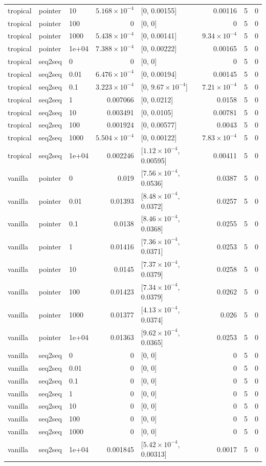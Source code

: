 \documentclass[10pt]{article}
\begin{document}
{\begin{longtable}{lllrlrrr}
tropical & pointer & 10 & $5.168\times10^{-4}$ & [0, 0.00155] & 0.00116 & 5 & 0\\
tropical & pointer & 100 & 0 & [0, 0] & 0 & 5 & 0\\
tropical & pointer & 1000 & $5.438\times10^{-4}$ & [0, 0.00141] & $9.34\times10^{-4}$ & 5 & 0\\
tropical & pointer & 1e+04 & $7.388\times10^{-4}$ & [0, 0.00222] & 0.00165 & 5 & 0\\
tropical & seq2seq & 0 & 0 & [0, 0] & 0 & 5 & 0\\
tropical & seq2seq & 0.01 & $6.476\times10^{-4}$ & [0, 0.00194] & 0.00145 & 5 & 0\\
tropical & seq2seq & 0.1 & $3.223\times10^{-4}$ & [0, $9.67\times10^{-4}$] & $7.21\times10^{-4}$ & 5 & 0\\
tropical & seq2seq & 1 & 0.007066 & [0, 0.0212] & 0.0158 & 5 & 0\\
tropical & seq2seq & 10 & 0.003491 & [0, 0.0105] & 0.00781 & 5 & 0\\
tropical & seq2seq & 100 & 0.001924 & [0, 0.00577] & 0.0043 & 5 & 0\\
tropical & seq2seq & 1000 & $5.504\times10^{-4}$ & [0, 0.00122] & $7.83\times10^{-4}$ & 5 & 0\\
tropical & seq2seq & 1e+04 & 0.002246 & [$1.12\times10^{-4}$, 0.00595] & 0.00411 & 5 & 0\\
vanilla & pointer & 0 & 0.019 & [$7.56\times10^{-4}$, 0.0536] & 0.0387 & 5 & 0\\
vanilla & pointer & 0.01 & 0.01393 & [$8.48\times10^{-4}$, 0.0372] & 0.0257 & 5 & 0\\
vanilla & pointer & 0.1 & 0.0138 & [$8.46\times10^{-4}$, 0.0368] & 0.0255 & 5 & 0\\
vanilla & pointer & 1 & 0.01416 & [$7.36\times10^{-4}$, 0.0371] & 0.0253 & 5 & 0\\
vanilla & pointer & 10 & 0.0145 & [$7.37\times10^{-4}$, 0.0379] & 0.0258 & 5 & 0\\
vanilla & pointer & 100 & 0.01423 & [$7.34\times10^{-4}$, 0.0379] & 0.0262 & 5 & 0\\
vanilla & pointer & 1000 & 0.01377 & [$4.13\times10^{-4}$, 0.0374] & 0.026 & 5 & 0\\
vanilla & pointer & 1e+04 & 0.01363 & [$9.62\times10^{-4}$, 0.0365] & 0.0253 & 5 & 0\\
vanilla & seq2seq & 0 & 0 & [0, 0] & 0 & 5 & 0\\
vanilla & seq2seq & 0.01 & 0 & [0, 0] & 0 & 5 & 0\\
vanilla & seq2seq & 0.1 & 0 & [0, 0] & 0 & 5 & 0\\
vanilla & seq2seq & 1 & 0 & [0, 0] & 0 & 5 & 0\\
vanilla & seq2seq & 10 & 0 & [0, 0] & 0 & 5 & 0\\
vanilla & seq2seq & 100 & 0 & [0, 0] & 0 & 5 & 0\\
vanilla & seq2seq & 1000 & 0 & [0, 0] & 0 & 5 & 0\\
vanilla & seq2seq & 1e+04 & 0.001845 & [$5.42\times10^{-4}$, 0.00313] & 0.0017 & 5 & 0\\
\bottomrule
\end{longtable}
}
\end{document}
